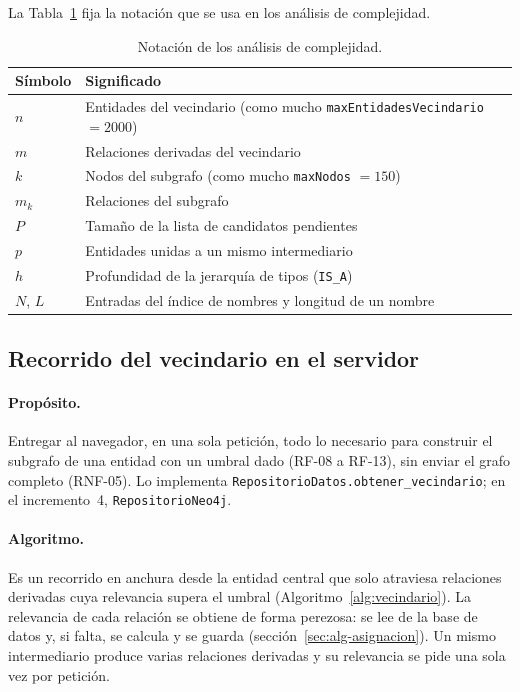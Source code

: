 La Tabla~\ref{tab:notacion} fija la notación que se usa en los análisis de complejidad.

\begin{table}[htbp]
\centering
\small
\caption{Notación de los análisis de complejidad.}
\label{tab:notacion}
\begin{tabular}{|p{}|p{}|}
\hline
\textbf{Símbolo} & \textbf{Significado} \\ \hline
$n$ & Entidades del vecindario (como mucho \texttt{maxEntidadesVecindario} $=2000$) \\ \hline
$m$ & Relaciones derivadas del vecindario \\ \hline
$k$ & Nodos del subgrafo (como mucho \texttt{maxNodos} $=150$) \\ \hline
$m_k$ & Relaciones del subgrafo \\ \hline
$P$ & Tamaño de la lista de candidatos pendientes \\ \hline
$p$ & Entidades unidas a un mismo intermediario \\ \hline
$h$ & Profundidad de la jerarquía de tipos (\texttt{IS\_A}) \\ \hline
$N$, $L$ & Entradas del índice de nombres y longitud de un nombre \\ \hline
\end{tabular}
\end{table}

\subsection{Recorrido del vecindario en el servidor}
\label{sec:alg-vecindario}

\paragraph{Propósito.} Entregar al navegador, en una sola petición, todo lo necesario para construir el subgrafo de una entidad con un umbral dado (RF-08 a RF-13), sin enviar el grafo completo (RNF-05). Lo implementa \texttt{RepositorioDatos.obtener\_vecindario}; en el incremento~4, \texttt{RepositorioNeo4j}.

\paragraph{Algoritmo.} Es un recorrido en anchura desde la entidad central que solo atraviesa relaciones derivadas cuya relevancia supera el umbral (Algoritmo~\ref{alg:vecindario}). La relevancia de cada relación se obtiene de forma perezosa: se lee de la base de datos y, si falta, se calcula y se guarda (sección~\ref{sec:alg-asignacion}). Un mismo intermediario produce varias relaciones derivadas y su relevancia se pide una sola vez por petición.

